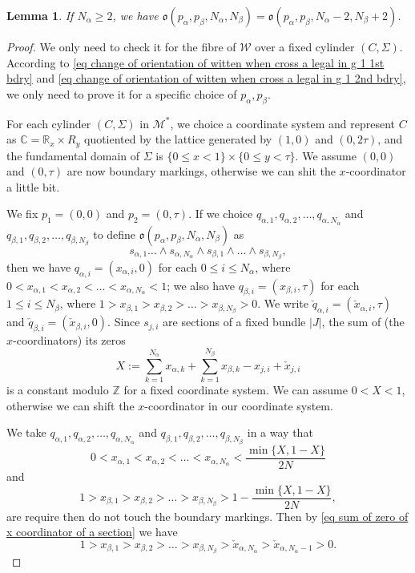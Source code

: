 \documentclass[11pt,a4paper]{article}
\newtheorem{lem}[dummy]{Lemma}
\theoremstyle{definition}
\theoremstyle{remark}
\numberwithin{equation}{section}
\begin{document}
\begin{lem}
    If $N_\alpha \ge 2$, we have  $\mathfrak o(p_\alpha,p_\beta,N_\alpha,N_\beta)=\mathfrak o(p_\alpha,p_\beta,N_\alpha-2,N_\beta+2)$.
\end{lem}
\begin{proof}
    We only need to check it for the fibre of $\mathcal W$ over a fixed cylinder $(C,\Sigma)$. According to \eqref{eq change of orientation of witten when cross a legal in g 1 1st bdry} and \eqref{eq change of orientation of witten when cross a legal in g 1 2nd bdry}, we only need to prove it for a specific choice of $p_\alpha,p_\beta$.

    For each cylinder $(C,\Sigma)$ in $\mathcal M^*$, we choice a coordinate system and represent $C$ as $\mathbb C=\mathbb R_x\times R_y$ quotiented by the lattice generated by $(1,0)$ and $(0,2\tau)$, and the fundamental domain of $\Sigma$ is $\{0\le x < 1\}\times \{0\le y < \tau\}$. We assume $(0,0)$ and $(0,\tau)$ are now boundary markings, otherwise we can shit the $x$-coordinator a little bit.

    We fix $p_1=(0,0)$ and $p_2=(0,\tau).$ If we choice $q_{\alpha,1},q_{\alpha,2},\dots,q_{\alpha,{N_\alpha}}$ and $q_{\beta,1},q_{\beta,2},\dots,q_{\beta,{N_\beta}}$ to define $\mathfrak o(p_\alpha,p_\beta,N_\alpha,N_\beta)$ as 
    $$
    s_{\alpha,1}\dots \wedge s_{\alpha,N_\alpha}\wedge s_{\beta,1}\wedge \dots \wedge s_{\beta,N_\beta},
    $$
    then we have $q_{\alpha,i}=(x_{\alpha,i},0)$ for each $0\le i \le N_\alpha$, where $0< x_{\alpha,1}<x_{\alpha,2}<\dots<x_{\alpha,N_\alpha}<1$; we also have $q_{\beta,i}=(x_{\beta,i},\tau)$ for each $1\le i \le N_\beta$, where $1> x_{\beta,1}>x_{\beta,2}>\dots>x_{\beta,N_\beta}>0$. We write $\check{q}_{\alpha,i}=(\check{x}_{\alpha,i},\tau)$ and $\check{q}_{\beta,i}=(\check{x}_{\beta,i},0)$.
    Since $s_{j,i}$ are sections of a fixed bundle $\lvert J \rvert$, the sum of (the $x$-coordinators) its zeros 
    \begin{equation}\label{eq sum of zero of x coordinator of a section}
        X:=\sum_{k=1}^{N_\alpha} x_{\alpha,k}+  \sum_{k=1}^{N_\beta} x_{\beta,k} -x_{j,i} + \check{x}_{j,i}
    \end{equation}
    is a constant modulo $\mathbb Z$ for a fixed coordinate system. We can assume $0< X < 1$, otherwise we can shift the $x$-coordinator in our coordinate system.

    We take  $q_{\alpha,1},q_{\alpha,2},\dots,q_{\alpha,{N_\alpha}}$ and $q_{\beta,1},q_{\beta,2},\dots,q_{\beta,{N_\beta}}$ in a way that 
    $$0< x_{\alpha,1}<x_{\alpha,2}<\dots<x_{\alpha,N_\alpha}<\frac{\operatorname{min}\{X,1-X\}}{2N}$$ 
    and 
    $$1> x_{\beta,1}>x_{\beta,2}>\dots>x_{\beta,N_\beta}>1-\frac{\operatorname{min}\{X,1-X\}}{2N},$$ 
    are require then do not touch the boundary markings. Then by \eqref{eq sum of zero of x coordinator of a section} we have 
    $$1> x_{\beta,1}>x_{\beta,2}>\dots>x_{\beta,N_\beta}> \check{x}_{\alpha,N_\alpha}> \check{x}_{\alpha,N_\alpha-1}>0.$$


\end{proof}
\end{document}
